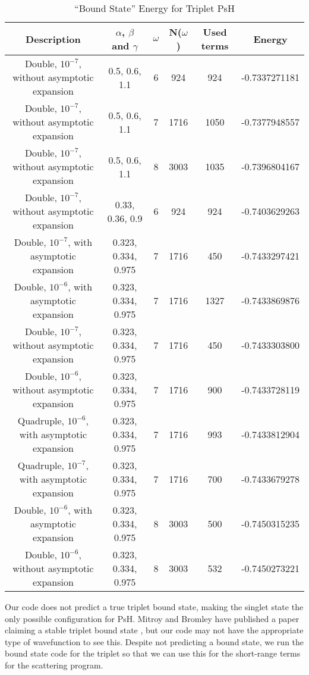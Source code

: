 \documentclass[Dissertation.tex]{subfiles}
\begin{document}
\begin{table}[H]
\centering
\begin{tabular}{|c|c|c|c|c|c|}
\hline
Description & $\alpha$, $\beta$ and $\gamma$ & $\omega$ & N($\omega$) & Used terms & Energy\\
\hline
Double, $10^{-7}$, without asymptotic expansion & 0.5, 0.6, 1.1 & 6 & 924 & 924 & -0.7337271181 \\
Double, $10^{-7}$, without asymptotic expansion & 0.5, 0.6, 1.1 & 7 & 1716 & 1050 & -0.7377948557 \\
Double, $10^{-7}$, without asymptotic expansion & 0.5, 0.6, 1.1 & 8 & 3003 & 1035 & -0.7396804167 \\

Double, $10^{-7}$, without asymptotic expansion & 0.33, 0.36, 0.9 & 6 & 924 & 924 & -0.7403629263 \\
Double, $10^{-7}$, with asymptotic expansion & 0.323, 0.334, 0.975 & 7 & 1716 & 450 & -0.7433297421 \\
\rowcolor{LightCyan}
Double, $10^{-6}$, with asymptotic expansion & 0.323, 0.334, 0.975 & 7 & 1716 & 1327 & -0.7433869876 \\
Double, $10^{-7}$, without asymptotic expansion & 0.323, 0.334, 0.975 & 7 & 1716 & 450 & -0.7433303800 \\
Double, $10^{-6}$, without asymptotic expansion & 0.323, 0.334, 0.975 & 7 & 1716 & 900 & -0.7433728119 \\
Quadruple, $10^{-6}$, with asymptotic expansion & 0.323, 0.334, 0.975 & 7 & 1716 & 993 & -0.7433812904 \\
Quadruple, $10^{-7}$, with asymptotic expansion & 0.323, 0.334, 0.975 & 7 & 1716 & 700 & -0.7433679278 \\
Double, $10^{-6}$, with asymptotic expansion & 0.323, 0.334, 0.975 & 8 & 3003 & 500 & -0.7450315235 \\
Double, $10^{-6}$, without asymptotic expansion & 0.323, 0.334, 0.975 & 8 & 3003 & 532 & -0.7450273221 \\
\hline
\end{tabular}
\caption{``Bound State'' Energy for Triplet PsH}
\label{tab:BoundTripletResults}
\end{table}

\indent Our code does not predict a true triplet bound state, making the singlet state the only possible configuration for PsH.  Mitroy and Bromley have published a paper claiming a stable triplet bound state \cite{Mitroy2007}, but our code may not have the appropriate type of wavefunction to see this.  Despite not predicting a bound state, we run the bound state code for the triplet so that we can use this for the short-range terms for the scattering program.
\end{document}
